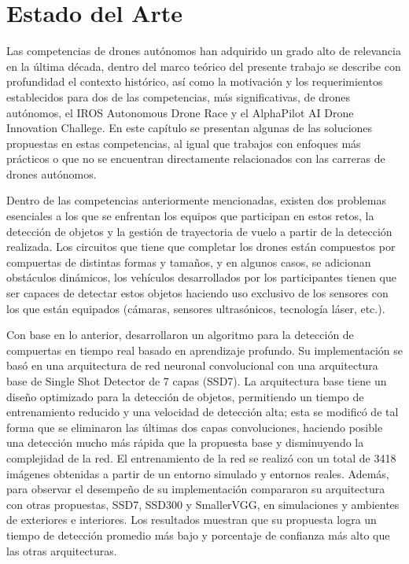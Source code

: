 \chapter{Estado del Arte}

Las competencias de drones autónomos han adquirido un grado alto de relevancia en la última década, dentro del marco teórico del presente trabajo se describe con profundidad el contexto histórico, así como la motivación y los requerimientos establecidos para dos de las competencias, más significativas, de drones autónomos, el  IROS Autonomous Drone Race y el AlphaPilot AI Drone Innovation Challege. 
En este capítulo se presentan algunas de las soluciones propuestas en estas competencias, al igual que trabajos con enfoques más prácticos o que no se encuentran directamente relacionados con las carreras de drones autónomos.

Dentro de las competencias anteriormente mencionadas, existen dos problemas esenciales a los que se enfrentan los equipos que participan en estos retos, la detección de objetos y la gestión de trayectoria de vuelo a partir de la detección realizada. 
Los circuitos que tiene que completar los drones están compuestos por compuertas de distintas formas y tamaños, y en algunos casos, se adicionan obstáculos dinámicos, los vehículos desarrollados por los participantes tienen que ser capaces de detectar estos objetos haciendo uso exclusivo de los sensores con los que están equipados (cámaras, sensores ultrasónicos, tecnología láser, etc.).

Con base en lo anterior, \citep{cabrera2019gate} desarrollaron un algoritmo para la detección de compuertas en tiempo real basado en aprendizaje profundo. Su implementación se basó en una arquitectura de red neuronal convolucional con una arquitectura base de Single Shot Detector de 7 capas (SSD7\cite{SSD7}). La arquitectura base tiene un diseño optimizado para la detección de objetos, permitiendo un tiempo de entrenamiento reducido y una velocidad de detección alta; esta se modificó de tal forma que se eliminaron las últimas dos capas convoluciones, haciendo posible una detección mucho más rápida que la propuesta base y disminuyendo la complejidad de la red. El entrenamiento de la red se realizó con un total de 3418 imágenes obtenidas a partir de un entorno simulado y entornos reales. 
Además, para observar el desempeño de su implementación compararon su arquitectura con otras propuestas, SSD7, SSD300 y SmallerVGG, en simulaciones y ambientes de exteriores e interiores. Los resultados muestran que su propuesta logra un tiempo de detección promedio más bajo y porcentaje de confianza más alto que las otras arquitecturas. 

